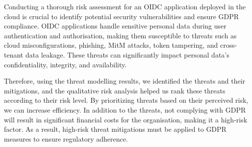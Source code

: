 Conducting a thorough risk assessment for an OIDC application deployed in the cloud is crucial to identify potential security vulnerabilities and ensure GDPR compliance. OIDC applications handle sensitive personal data during user authentication and authorisation, making them susceptible to threats such as cloud misconfigurations, phishing, MitM attacks, token tampering, and cross-tenant data leakage. These threats can significantly impact personal data's confidentiality, integrity, and availability. 

Therefore, using the threat modelling results, we identified the threats and their mitigations, and the qualitative risk analysis helped us rank these threats according to their risk level. By prioritizing threats based on their perceived risk, we can increase efficiency. In addition to the threats, not complying with GDPR will result in significant financial costs for the organisation, making it a high-risk factor. As a result, high-risk threat mitigations must be applied to GDPR measures to ensure regulatory adherence. 








